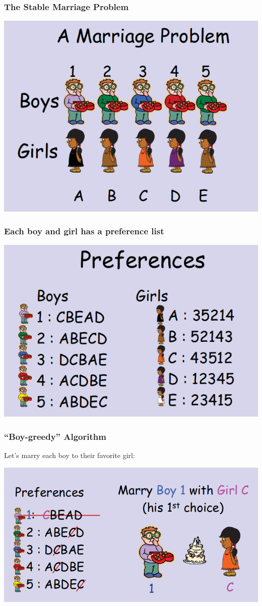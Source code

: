\documentclass{beamer}
\begin{document}
\begin{frame}
  \frametitle{The Stable Marriage Problem}
  \begin{center}
    \includegraphics[width=.8\textwidth]{../img/marriage1}
  \end{center}
\end{frame}

\begin{frame}
  \frametitle{Each boy and girl has a preference list}
  \begin{center}
    \includegraphics[width=.8\textwidth]{../img/marriage2}
  \end{center}
\end{frame}

\begin{frame}
  \frametitle{``Boy-greedy'' Algorithm}

  {\larger
    Let's marry each boy to their favorite girl:
  }
  \begin{center}
    \includegraphics[width=.8\textwidth]{../img/marriage3}
  \end{center}
\end{frame}
\end{document}
